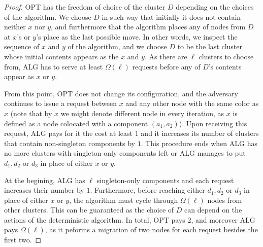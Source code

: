 \begin{proof}
OPT has the freedom of choice of the cluster $D$ depending on the choices of the algorithm.
We choose $D$ in such way that initially it does not contain neither $x$ nor $y$, and furthermore that the algorithm places any of nodes from $D$ at $x$'s or $y$'s place as the last possible move.
In other words, we inspect the sequence of $x$ and $y$ of the algorithm, and we choose $D$ to be the last cluster whose initial contents appears as the $x$ and $y$.
As there are $\ell$ clusters to choose from, ALG has to serve at least $\Omega(\ell)$ requests before any of $D$'s contents appear as $x$ or $y$.

From this point, OPT does not change its configuration, and the adversary continues to issue a request between $x$ and any other node with the same color as $x$
(note that by $x$ we might denote different node in every iteration, as $x$ is defined as a node colocated with a component $(a_1, a_2)$).
Upon receiving this request, ALG pays for it the cost at least $1$ and it increases its number of clusters that contain non-singleton components by $1$.
This procedure ends when ALG has no more clusters with singleton-only components left or ALG manages to put $d_1, d_2$ or $d_3$ in place of either $x$ or $y$.

At the begining, ALG has $\ell$ singleton-only components and each request increases their number by $1$.
Furthermore, before reaching either $d_1, d_2$ or $d_3$ in place of either $x$ or $y$, the algorithm must cycle through $\Omega(\ell)$ nodes from other clusters. This can be guaranteed as the choice of $D$ can depend on the actions of the deterministic algorithm.
In total, OPT pays $2$, and moreover ALG pays $\Omega(\ell)$, as it peforms a migration of two nodes for each request besides the first two.





\end{proof}

